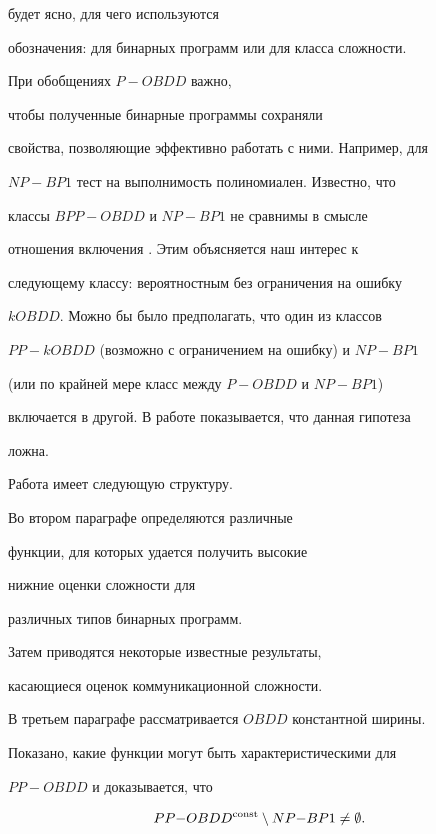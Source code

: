 будет ясно, для чего используются


обозначения: для бинарных программ или для класса сложности.





При обобщениях $P{-}OBDD$ важно,


чтобы полученные бинарные программы сохраняли


свойства, позволяющие эффективно работать с ними. Например, для


$NP{-}BP1$ тест на выполнимость полиномиален. Известно, что


классы $BPP{-}OBDD$ и $NP{-}BP1$ не сравнимы в смысле


отношения включения \cite{S98}. Этим объясняется наш интерес к


следующему классу: вероятностным без ограничения на ошибку


$kOBDD$. Можно бы было предполагать, что один из классов


$PP{-}kOBDD$ (возможно с ограничением на ошибку) и $NP{-}BP1$


(или по крайней мере класс между $P{-}OBDD$ и $NP{-}BP1$)


включается в другой. В работе показывается, что данная гипотеза


ложна.





Работа имеет следующую структуру.


Во втором параграфе определяются различные


функции, для которых удается получить высокие


нижние оценки сложности для


различных типов бинарных программ.


Затем приводятся некоторые известные результаты,


касающиеся оценок коммуникационной сложности.





В третьем параграфе рассматривается $OBDD$ константной ширины.


Показано, какие функции могут быть характеристическими для


$PP{-}OBDD$ и доказывается, что


$$


PP{-}OBDD^{\const}\setminus NP{-}BP1\ne\emptyset.


$$





